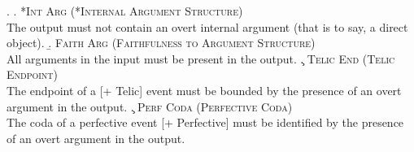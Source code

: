 
\ex. \label{medina_constraints} 
\a. \label{medina_constraints_intarg} \textsc{*Int Arg (*Internal Argument Structure)}\\ The output must not contain an overt internal argument (that is to say, a direct object).
\b. \label{medina_constraints_faith} \textsc{Faith Arg (Faithfulness to Argument Structure)}\\ All arguments in the input must be present in the output.
\c. \label{medina_constraints_telic} \textsc{Telic End (Telic Endpoint)}\\ The endpoint of a [+ Telic] event must be bounded by the presence of an overt argument in the output.
\c. \label{medina_constraints_perf} \textsc{Perf Coda (Perfective Coda)}\\ The coda of a perfective event [+ Perfective] must be identified by the presence of an overt argument in the output.

